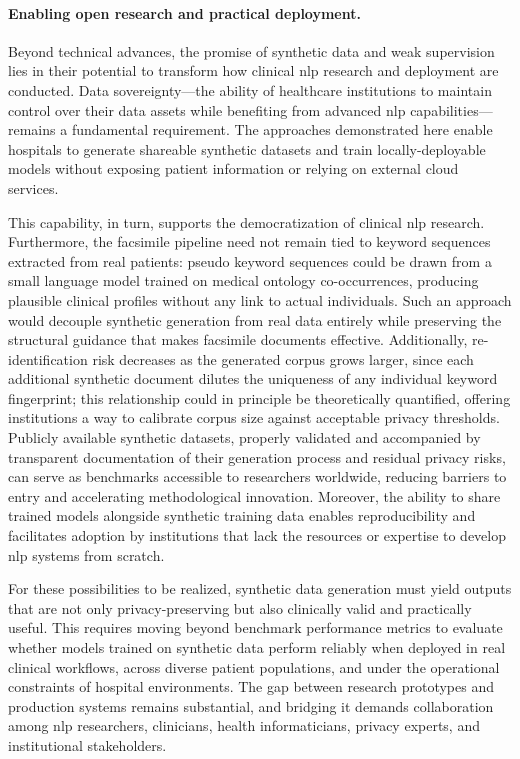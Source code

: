 \paragraph{Enabling open research and practical deployment.}
Beyond technical advances, the promise of synthetic data and weak supervision lies in their potential to transform how clinical \gls{nlp} research and deployment are conducted.
Data sovereignty—the ability of healthcare institutions to maintain control over their data assets while benefiting from advanced \gls{nlp} capabilities—remains a fundamental requirement.
The approaches demonstrated here enable hospitals to generate shareable synthetic datasets and train locally-deployable models without exposing patient information or relying on external cloud services.

This capability, in turn, supports the democratization of clinical \gls{nlp} research.
Furthermore, the facsimile pipeline need not remain tied to keyword sequences extracted from real patients: pseudo keyword sequences could be drawn from a small language model trained on medical ontology co-occurrences, producing plausible clinical profiles without any link to actual individuals.
Such an approach would decouple synthetic generation from real data entirely while preserving the structural guidance that makes facsimile documents effective.
Additionally, re-identification risk decreases as the generated corpus grows larger, since each additional synthetic document dilutes the uniqueness of any individual keyword fingerprint; this relationship could in principle be theoretically quantified, offering institutions a way to calibrate corpus size against acceptable privacy thresholds.
Publicly available synthetic datasets, properly validated and accompanied by transparent documentation of their generation process and residual privacy risks, can serve as benchmarks accessible to researchers worldwide, reducing barriers to entry and accelerating methodological innovation.
Moreover, the ability to share trained models alongside synthetic training data enables reproducibility and facilitates adoption by institutions that lack the resources or expertise to develop \gls{nlp} systems from scratch.

For these possibilities to be realized, synthetic data generation must yield outputs that are not only privacy-preserving but also clinically valid and practically useful.
This requires moving beyond benchmark performance metrics to evaluate whether models trained on synthetic data perform reliably when deployed in real clinical workflows, across diverse patient populations, and under the operational constraints of hospital environments.
The gap between research prototypes and production systems remains substantial, and bridging it demands collaboration among \gls{nlp} researchers, clinicians, health informaticians, privacy experts, and institutional stakeholders.


